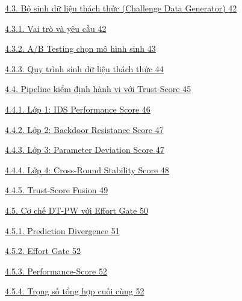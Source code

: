 \hyperref[bux1ed9-sinh-dux1eef-liux1ec7u-thuxe1ch-thux1ee9c-challenge-data-generator]{4.3. Bộ sinh dữ liệu thách thức (Challenge Data Generator) \hyperref[bux1ed9-sinh-dux1eef-liux1ec7u-thuxe1ch-thux1ee9c-challenge-data-generator]{42}}

\hyperref[vai-truxf2-vuxe0-yuxeau-cux1ea7u]{4.3.1. Vai trò và yêu cầu \hyperref[vai-truxf2-vuxe0-yuxeau-cux1ea7u]{42}}

\hyperref[ab-testing-chux1ecdn-muxf4-huxecnh-sinh]{4.3.2. A/B Testing chọn mô hình sinh \hyperref[ab-testing-chux1ecdn-muxf4-huxecnh-sinh]{43}}

\hyperref[quy-truxecnh-sinh-dux1eef-liux1ec7u-thuxe1ch-thux1ee9c]{4.3.3. Quy trình sinh dữ liệu thách thức \hyperref[quy-truxecnh-sinh-dux1eef-liux1ec7u-thuxe1ch-thux1ee9c]{44}}

\hyperref[pipeline-kiux1ec3m-ux111ux1ecbnh-huxe0nh-vi-vux1edbi-trust-score]{4.4. Pipeline kiểm định hành vi với Trust-Score \hyperref[pipeline-kiux1ec3m-ux111ux1ecbnh-huxe0nh-vi-vux1edbi-trust-score]{45}}

\hyperref[lux1edbp-1-ids-performance-score]{4.4.1. Lớp 1: IDS Performance Score \hyperref[lux1edbp-1-ids-performance-score]{46}}

\hyperref[lux1edbp-2-backdoor-resistance-score]{4.4.2. Lớp 2: Backdoor Resistance Score \hyperref[lux1edbp-2-backdoor-resistance-score]{47}}

\hyperref[lux1edbp-3-parameter-deviation-score]{4.4.3. Lớp 3: Parameter Deviation Score \hyperref[lux1edbp-3-parameter-deviation-score]{47}}

\hyperref[lux1edbp-4-cross-round-stability-score]{4.4.4. Lớp 4: Cross-Round Stability Score \hyperref[lux1edbp-4-cross-round-stability-score]{48}}

\hyperref[trust-score-fusion]{4.4.5. Trust-Score Fusion \hyperref[trust-score-fusion]{49}}

\hyperref[cux1a1-chux1ebf-dt-pw-vux1edbi-effort-gate]{4.5. Cơ chế DT-PW với Effort Gate \hyperref[cux1a1-chux1ebf-dt-pw-vux1edbi-effort-gate]{50}}

\hyperref[prediction-divergence]{4.5.1. Prediction Divergence \hyperref[prediction-divergence]{51}}

\hyperref[effort-gate]{4.5.2. Effort Gate \hyperref[effort-gate]{52}}

\hyperref[performance-score]{4.5.3. Performance-Score \hyperref[performance-score]{52}}

\hyperref[trux1ecdng-sux1ed1-tux1ed5ng-hux1ee3p-cuux1ed1i-cuxf9ng]{4.5.4. Trọng số tổng hợp cuối cùng \hyperref[trux1ecdng-sux1ed1-tux1ed5ng-hux1ee3p-cuux1ed1i-cuxf9ng]{52}}

